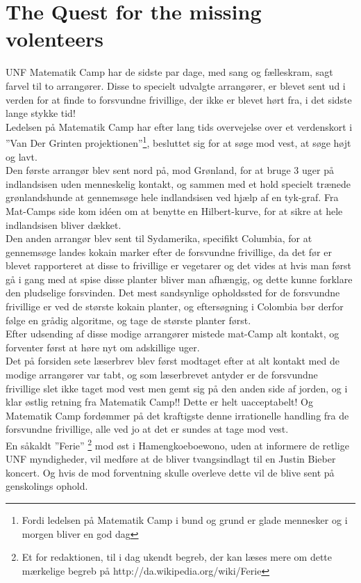 \begin{minipage}[t]{185mm}
\vspace{3mm}
\section*{The Quest for the missing volenteers}
UNF Matematik Camp har de sidste par dage, med sang og fælleskram, sagt farvel til to arrangører. Disse to specielt udvalgte arrangører, er blevet sent ud i verden for at finde to forsvundne frivillige, der ikke er blevet hørt fra, i det sidste lange stykke tid! \\ 
Ledelsen på Matematik Camp har efter lang tids overvejelse over et verdenskort i ”Van Der Grinten projektionen”\footnote{Fordi ledelsen på Matematik Camp i bund og grund er glade mennesker og i morgen bliver en god dag}, besluttet sig for at søge mod vest, at søge højt og lavt. \\
Den første arrangør blev sent nord på, mod Grønland, for at bruge 3 uger på indlandsisen uden menneskelig kontakt, og sammen med et hold specielt trænede grønlandshunde at gennemsøge hele indlandsisen ved hjælp af en tyk-graf. Fra Mat-Camps side kom idéen om at benytte en Hilbert-kurve, for at sikre at hele indlandsisen bliver dækket. \\
Den anden arrangør blev sent til Sydamerika, specifikt Columbia, for at gennemsøge landes kokain marker efter de forsvundne frivillige, da det før er blevet rapporteret at disse to frivillige er vegetarer og det vides at hvis man først gå i gang med at spise disse planter bliver man afhængig, og dette kunne forklare den pludselige forsvinden.  Det mest sandsynlige opholdssted for de forsvundne frivillige er ved de største kokain planter, og eftersøgning i Colombia bør derfor følge en grådig algoritme, og tage de største planter først. \\
Efter udsending af disse modige arrangører mistede mat-Camp alt kontakt, og forventer først at høre nyt om adskillige uger. \\
Det på forsiden sete læserbrev blev først modtaget efter at alt kontakt med de modige arrangører var tabt, og som læserbrevet antyder er de forsvundne frivillige slet ikke taget mod vest men gemt sig på den anden side af jorden, og i klar østlig retning fra Matematik Camp!! Dette er helt uacceptabelt! Og Matematik Camp fordømmer på det kraftigste denne irrationelle handling fra de forsvundne frivillige, alle ved jo at det er sundes at tage mod vest. \\
En såkaldt ”Ferie” \footnote{Et for redaktionen, til i dag ukendt begreb, der kan læses mere om dette mærkelige begreb på http://da.wikipedia.org/wiki/Ferie} mod øst i Hamengkoeboewono, uden at informere de retlige UNF myndigheder, vil medføre at de bliver tvangsindlagt til en Justin Bieber koncert. Og hvis de mod forventning skulle overleve dette vil de blive sent på genskolings ophold.


\end{minipage}

